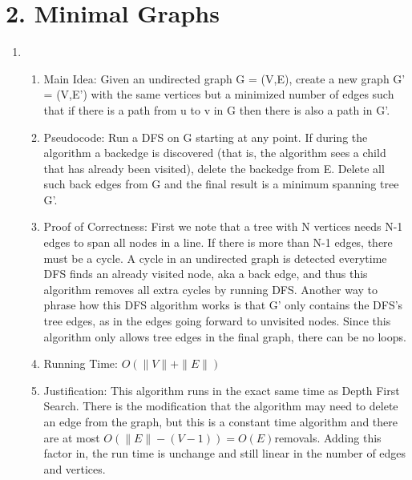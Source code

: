 \documentclass[11pt]{article}
\newenvironment{qparts}{\begin{enumerate}[{(}a{)}]}{\end{enumerate}}
\begin{document}
\section*{2. Minimal Graphs}
\begin{qparts}
\item
\begin{enumerate}
\item Main Idea: Given an undirected graph G = (V,E), create a new graph G' = (V,E') with the same vertices but a minimized number of edges such that if there is a path from u to v in G then there is also a path in G'.
\item Pseudocode: Run a DFS on G starting at any point. If during the algorithm a backedge is discovered (that is, the algorithm sees a child that has already been visited), delete the backedge from E. Delete all such back edges from G and the final result is a minimum spanning tree G'.
\item Proof of Correctness: First we note that a tree with N vertices needs N-1 edges to span all nodes in a line. If there is more than N-1 edges, there must be a cycle. A cycle in an undirected graph is detected everytime DFS finds an already visited node, aka a back edge, and thus this algorithm removes all extra cycles by running DFS. Another way to phrase how this DFS algorithm works is that G' only contains the DFS's tree edges, as in the edges going forward to unvisited nodes. Since this algorithm only allows tree edges in the final graph, there can be no loops.
\item Running Time: $O(\|V\|+\|E\|)$
\item Justification: This algorithm runs in the exact same time as Depth First Search. There is the modification that the algorithm may need to delete an edge from the graph, but this is a constant time algorithm and there are at most $O(\|E\| - (V-1)) = O(E) $removals. Adding this factor in, the run time is unchange and still linear in the number of edges and vertices.
\end{enumerate}


\end{qparts}
\end{document}
